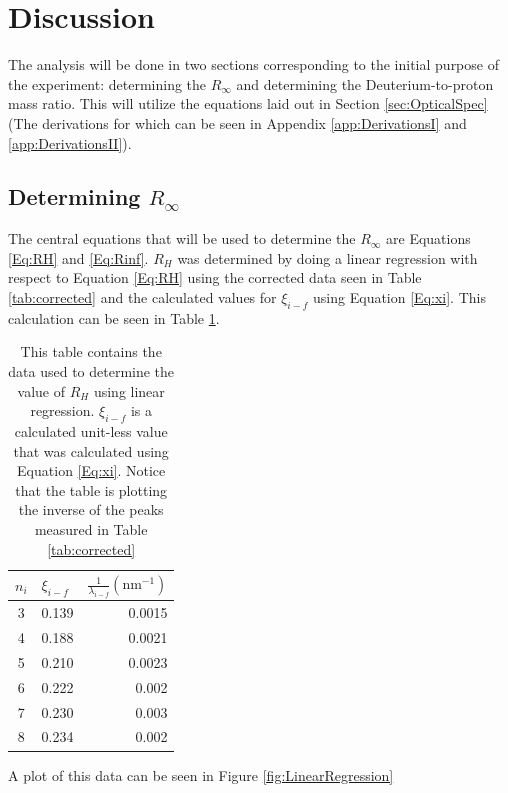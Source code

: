 \documentclass[%
 aps,%
 pra,%
 preprint, %
 amsmath, %
 amsfonts, %
 amssymb, %
]{revtex4-2}
\newcommand{\D}{Deuterium}
\newcommand{\Rin}{$R_\infty$ }
\begin{document}
\section{\label{sec:Discussion} Discussion}
The analysis will be done in two sections corresponding to the initial purpose of the experiment: determining the $R_\infty$ and determining the \D-to-proton mass ratio. This will utilize the equations laid out in Section \ref{sec:OpticalSpec}(The derivations for which can be seen in Appendix \ref{app:DerivationsI} and \ref{app:DerivationsII}). 



\subsection{\label{sec:Rinf}Determining $R_\infty$}

The central equations that will be used to determine the \Rin  are Equations \ref{Eq:RH} and \ref{Eq:Rinf}. $R_H$ was determined by doing a linear regression with respect to Equation \ref{Eq:RH} using the corrected data seen in Table \ref{tab:corrected} and the calculated values for $\xi_{i-f}$ using Equation \ref{Eq:xi}. This calculation can be seen in Table \ref{tab:RH}.
\begin{table}[]
\begin{tabular}{c|r|r}
\hline
\hline
$n_i$ & \multicolumn{1}{l|}{$\xi_{i-f}$} & \multicolumn{1}{l}{$\frac{1}{\lambda_{i-f}}(\text{nm}^{-1})$} \\ \hline
3     & 0.139                            & 0.0015                                                        \\
4     & 0.188                            & 0.0021                                                        \\
5     & 0.210                            & 0.0023                                                        \\
6     & 0.222                            & 0.002                                                         \\
7     & 0.230                            & 0.003                                                         \\
8     & 0.234                            & 0.002                                                         \\ 
\hline
\hline
\end{tabular}
\caption{This table contains the data used to determine the value of $R_H$ using linear regression. $\xi_{i-f}$ is a calculated unit-less value that was calculated using Equation \ref{Eq:xi}. Notice that the table is plotting the inverse of the peaks measured in Table \ref{tab:corrected}}
\label{tab:RH}
\end{table}
\newpage
A plot of this data can be seen in Figure \ref{fig:LinearRegression}
\end{document}
